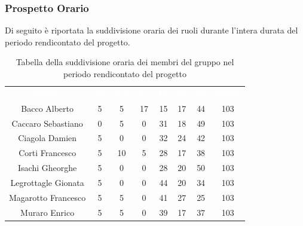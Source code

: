 \subsubsection{Prospetto Orario}
Di seguito è riportata la suddivisione oraria dei ruoli durante l'intera durata del periodo rendicontato del progetto.


\begin{table}[H]	
	\begin{center}
	    \begin{tabular}{cccccccc}
			\rowcolor{greySWEight}
			\textcolor{white}{\textbf{Nome}} & \textcolor{white}{\textbf{Re}} & \textcolor{white}{\textbf{Am}} & \textcolor{white}{\textbf{An}} & \textcolor{white}{\textbf{Pj}} & \textcolor{white}{\textbf{Pr}} & \textcolor{white}{\textbf{Ve}} & \textcolor{white}{\textbf{Totale}}
			\\			

			Bacco Alberto & 5 & 5 & 17 & 15 & 17 & 44 & 103 \\
			Caccaro Sebastiano & 0 & 5 & 0 & 31 & 18 & 49 & 103 \\
			Ciagola Damien & 5 & 0 & 0 & 32 & 24 & 42 & 103 \\
			Corti Francesco & 5 & 10 & 5 & 28 & 17 & 38 & 103 \\
			Isachi Gheorghe & 5 & 0 & 0 & 28 & 20 & 50 & 103 \\
			Legrottagle Gionata & 5 & 0 & 0 & 44 & 20 & 34 & 103 \\
			Magarotto Francesco & 5 & 5 & 0 & 41 & 27 & 25 & 103 \\
			Muraro Enrico & 5 & 5 & 0 & 39 & 17 & 37 & 103 \\
			\end{tabular}
	    \caption{Tabella della suddivisione oraria dei membri del gruppo nel periodo rendicontato del progetto} \label{tab:tabellaPersoneTotale} 
	\end{center}
\end{table}

